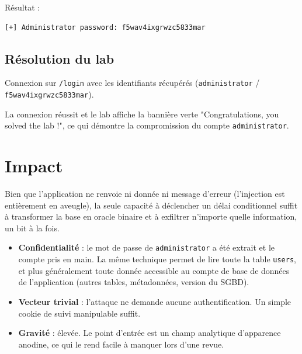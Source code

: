 \documentclass[11pt,a4paper]{article}
\begin{document}
Résultat :

\begin{lstlisting}
[+] Administrator password: f5wav4ixgrwzc5833mar
\end{lstlisting}


\subsection{Résolution du lab}
Connexion sur \texttt{/login} avec les identifiants récupérés
(\texttt{administrator} / \texttt{f5wav4ixgrwzc5833mar}).


La connexion réussit et le lab affiche la bannière verte "Congratulations,
you solved the lab !", ce qui démontre la compromission du compte
\texttt{administrator}.


\section{Impact}
Bien que l'application ne renvoie ni donnée ni message d'erreur (l'injection
est entièrement en aveugle), la seule capacité à déclencher un délai
conditionnel suffit à transformer la base en oracle binaire et à exfiltrer
n'importe quelle information, un bit à la fois.

\begin{itemize}
  \item \textbf{Confidentialité} : le mot de passe de \texttt{administrator} a été extrait et le compte pris en main. La même technique permet de lire toute la table \texttt{users}, et plus généralement toute donnée accessible au compte de base de données de l'application (autres tables, métadonnées, version du SGBD).
  \item \textbf{Vecteur trivial} : l'attaque ne demande aucune authentification. Un simple cookie de suivi manipulable suffit.
  \item \textbf{Gravité} : élevée. Le point d'entrée est un champ analytique d'apparence anodine, ce qui le rend facile à manquer lors d'une revue.
\end{itemize}
\end{document}
